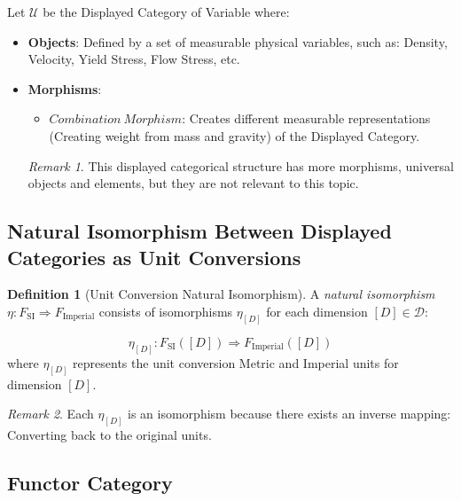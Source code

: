 \documentclass{article}
\theoremstyle{definition}
\newtheorem{definition}{Definition}[section]
\theoremstyle{remark}
\newtheorem*{remark}{Remark}
\begin{document}
	
	\noindent Let $\mathcal{U}$ be the Displayed Category of Variable where:
	\begin{itemize}
		\item \textbf{Objects}: Defined by a set of measurable physical variables, such as:
		\subitem[i.e.] Density, Velocity, Yield Stress, Flow Stress, etc.
		
		\item \textbf{Morphisms}: 
		\begin{itemize}
			\item $Combination \ Morphism$: Creates different measurable representations (Creating weight from mass and gravity) of the Displayed Category.
		\end{itemize}
		
		\begin{remark}
			This displayed categorical structure has more morphisms, universal objects and elements, but they are not relevant to this topic.
		\end{remark}
		
		
	\end{itemize}
	
	
	
	
	
	
	\subsection{Natural Isomorphism Between Displayed Categories as Unit Conversions}
	
	\begin{definition}[Unit Conversion Natural Isomorphism]
		A \emph{natural isomorphism} $\eta: F_{\text{SI}} \Rightarrow F_{\text{Imperial}}$ consists of isomorphisms $\eta_{[D]}$ for each dimension $[D] \in \mathcal{D}$:
		
		$$\eta_{[D]}: F_{\text{SI}}([D]) \Rightarrow F_{\text{Imperial}}([D])$$
		where $\eta_{[D]}$ represents the unit conversion Metric and Imperial units for dimension $[D]$.
		
		\begin{remark}
			Each $\eta_{[D]}$ is an isomorphism because there exists an inverse mapping: Converting back to the original units.
		\end{remark}
		
	\end{definition}
	
	\subsection{Functor Category}
	
\end{document}
